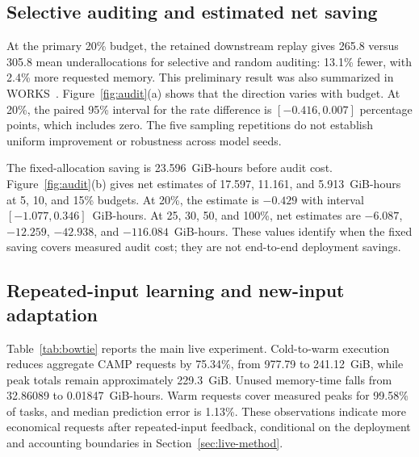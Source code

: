 \begin{table}[!t]
\caption{Four feature variants with configuration held fixed (5,026 tasks). U: underallocation count; R: aggregate requests in thousands of GiB.}
\label{tab:features}
\centering\small

\end{table}

\subsection{Selective auditing and estimated net saving}
At the primary 20\% budget, the retained downstream replay gives 265.8
versus 305.8 mean underallocations for selective and random auditing:
13.1\% fewer, with 2.4\% more requested memory. This preliminary result
was also summarized in WORKS~\cite{camp2026works}. Figure~\ref{fig:audit}(a)
shows that the direction varies with budget. At 20\%, the paired 95\%
interval for the rate difference is $[-0.416,0.007]$ percentage points,
which includes zero. The five sampling repetitions do not establish
uniform improvement or robustness across model seeds.



The fixed-allocation saving is 23.596~GiB-hours before audit cost.
Figure~\ref{fig:audit}(b) gives net estimates of 17.597, 11.161, and
5.913~GiB-hours at 5, 10, and 15\% budgets. At 20\%, the estimate is
$-0.429$ with interval $[-1.077,0.346]$~GiB-hours. At 25, 30, 50, and
100\%, net estimates are $-6.087$, $-12.259$, $-42.938$, and
$-116.084$~GiB-hours. These values identify when the fixed saving covers
measured audit cost; they are not end-to-end deployment savings.


\subsection{Repeated-input learning and new-input adaptation}
Table~\ref{tab:bowtie} reports the main live experiment. Cold-to-warm
execution reduces aggregate CAMP requests by 75.34\%, from 977.79 to
241.12~GiB, while peak totals remain approximately 229.3~GiB.
Unused memory-time falls from 32.86089 to 0.01847~GiB-hours.
Warm requests cover measured peaks for 99.58\% of tasks, and median
prediction error is 1.13\%. These observations indicate more economical
requests after repeated-input feedback, conditional on the deployment
and accounting boundaries in Section~\ref{sec:live-method}.

\begin{table}[!t]
\caption{Main live experiment (Warm-Transfer): 6,000 successful tasks per stage. Requests, coverage, and unused memory exclude the execution allowance.}
\label{tab:bowtie}
\centering\footnotesize
\setlength{\tabcolsep}{3pt}

\end{table}

